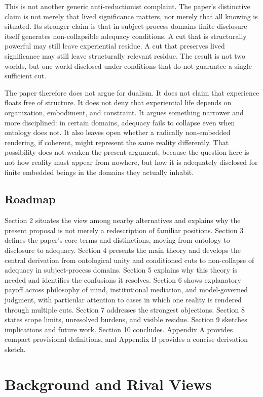\documentclass[11pt]{article}
\begin{document}
This is not another generic anti-reductionist complaint. The paper's distinctive claim is not merely that lived significance matters, nor merely that all knowing is situated. Its stronger claim is that in subject-process domains finite disclosure itself generates non-collapsible adequacy conditions. A cut that is structurally powerful may still leave experiential residue. A cut that preserves lived significance may still leave structurally relevant residue. The result is not two worlds, but one world disclosed under conditions that do not guarantee a single sufficient cut.

The paper therefore does not argue for dualism. It does not claim that experience floats free of structure. It does not deny that experiential life depends on organization, embodiment, and constraint. It argues something narrower and more disciplined: in certain domains, adequacy fails to collapse even when ontology does not. It also leaves open whether a radically non-embedded rendering, if coherent, might represent the same reality differently. That possibility does not weaken the present argument, because the question here is not how reality must appear from nowhere, but how it is adequately disclosed for finite embedded beings in the domains they actually inhabit.

\subsection{Roadmap}

Section 2 situates the view among nearby alternatives and explains why the present proposal is not merely a redescription of familiar positions. Section 3 defines the paper's core terms and distinctions, moving from ontology to disclosure to adequacy. Section 4 presents the main theory and develops the central derivation from ontological unity and conditioned cuts to non-collapse of adequacy in subject-process domains. Section 5 explains why this theory is needed and identifies the confusions it resolves. Section 6 shows explanatory payoff across philosophy of mind, institutional mediation, and model-governed judgment, with particular attention to cases in which one reality is rendered through multiple cuts. Section 7 addresses the strongest objections. Section 8 states scope limits, unresolved burdens, and visible residue. Section 9 sketches implications and future work. Section 10 concludes. Appendix A provides compact provisional definitions, and Appendix B provides a concise derivation sketch.
\section{Background and Rival Views}
\end{document}
